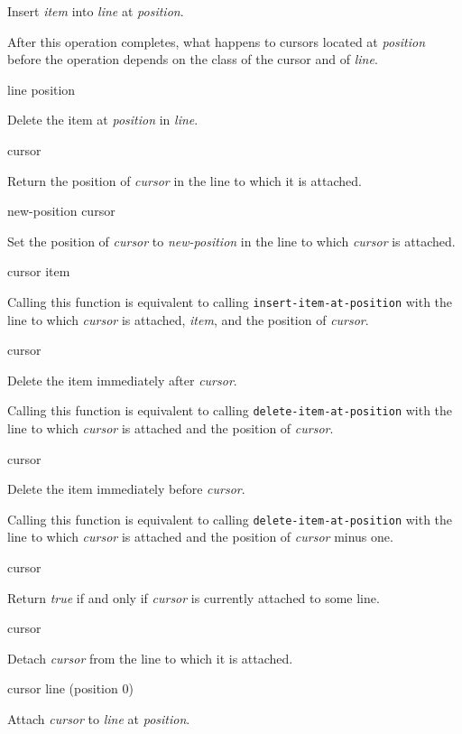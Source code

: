 Insert \textit{item} into \textit{line} at \textit{position}.

After this operation completes, what happens to cursors located at
\textit{position} before the operation depends on the class of the
cursor and of \textit{line}.

 {line position}

Delete the item at \textit{position} in \textit{line}.

 {cursor}

Return the position of \textit{cursor} in the line to which it is
attached.

 {new-position cursor}

Set the position of \textit{cursor} to \textit{new-position} in the
line to which \textit{cursor} is attached.

 {cursor item}

Calling this function is equivalent to calling
\texttt{insert-item-at-position} with the line to which
\textit{cursor} is attached, \textit{item}, and the position of
\textit{cursor}.

 {cursor}

Delete the item immediately after \emph{cursor}.

Calling this function is equivalent to calling
\texttt{delete-item-at-position} with the line to which
\textit{cursor} is attached and the position of \textit{cursor}.

 {cursor}

Delete the item immediately before \emph{cursor}.

Calling this function is equivalent to calling
\texttt{delete-item-at-position} with the line to which
\textit{cursor} is attached and the position of \textit{cursor} minus
one.

 {cursor}

Return \emph{true} if and only if \textit{cursor} is currently
attached to some line.

 {cursor}

Detach \textit{cursor} from the line to which it is attached.

 {cursor line \optional (position 0)}

Attach \textit{cursor} to \textit{line} at \textit{position}.
